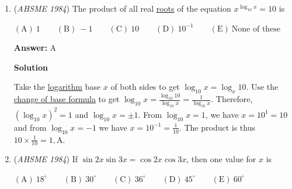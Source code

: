 \begin{enumerate}
 Now to get rid of the $\sqrt{15}$ in the denominator. Multiply the numerator and denominator by $-3+\sqrt{15}$ to get

 $\frac{(2\sqrt{3}-3\sqrt{2}-\sqrt{30})(-3+\sqrt{15})}{(-3-\sqrt{15})(-3+\sqrt{15})}$
$=\frac{-6\sqrt{3}+9\sqrt{2}+3\sqrt{30}+2\sqrt{45}-3\sqrt{30}-\sqrt{450}}{9-15}$
$=\frac{-6\sqrt{3}+9\sqrt{2}+3\sqrt{30}+6\sqrt{5}-3\sqrt{30}-15\sqrt{2}}{-6}$
$=\sqrt{2}+\sqrt{3}-\sqrt{5}, \boxed{\text{A}}$.

 



\textbf{Solution 2}

Multiply the numerator and denominator by $\sqrt{2}+\sqrt{3}-\sqrt{5}$. We get $\frac{(2\sqrt{6})(\sqrt{2}+\sqrt{3}-\sqrt{5})}{(\sqrt{2}+\sqrt{3}+\sqrt{5})(\sqrt{2}+\sqrt{3}-\sqrt{5})}$

 \[\frac{(2\sqrt{6})(\sqrt{2}+\sqrt{3}-\sqrt{5})}{2+3-5+2\sqrt{6}+\sqrt{10}-\sqrt{10}+\sqrt{15}-\sqrt{15}}=\frac{(2\sqrt{6})(\sqrt{2}+\sqrt{3}-\sqrt{5})}{2\sqrt{6}}=\sqrt{2}+\sqrt{3}-\sqrt{5}\]$\boxed{A}$



	\item (\textit{AHSME 1984}) The product of all real \href{https://artofproblemsolving.com/wiki/index.php?title=Root\_(polynomial)}{roots} of the equation $x^{\log_{10}{x}}=10$ is


 $\mathrm{(A) \ }1 \qquad \mathrm{(B) \ }-1 \qquad \mathrm{(C) \ } 10 \qquad \mathrm{(D) \ }10^{-1} \qquad \mathrm{(E) \ } \text{None of these}$

 \textbf{Answer: }A



\textbf{Solution}

Take the \href{https://artofproblemsolving.com/wiki/index.php?title=Logarithm}{logarithm} base $x$ of both sides to get $\log_{10}x=\log_x10$. Use the \href{https://artofproblemsolving.com/wiki/index.php?title=Change\_of\_base\_formula}{change of base formula} to get $\log_{10}x=\frac{\log_{10}10}{\log_{10}x}=\frac{1}{\log_{10}x}$. Therefore, $(\log_{10}x)^2=1$ and $\log_{10}x=\pm1$. From $\log_{10}x=1$, we have $x=10^1=10$ and from $\log_{10}x=-1$ we have $x=10^{-1}=\frac{1}{10}$. The product is thus $10\times\frac{1}{10}=1, \boxed{\text{A}}$.

 


	\item (\textit{AHSME 1984}) If $\sin{2x}\sin{3x}=\cos{2x}\cos{3x}$, then one value for $x$ is


 $\mathrm{(A) \ }18^\circ \qquad \mathrm{(B) \ }30^\circ \qquad \mathrm{(C) \ } 36^\circ \qquad \mathrm{(D) \ }45^\circ \qquad \mathrm{(E) \ } 60^\circ$


\end{enumerate}
